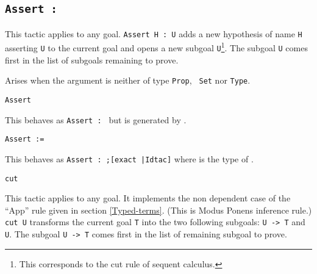 \subsection{\tt Assert {\ident} : {\form}}

This tactic applies to any goal. {\tt Assert H : U} adds a new
hypothesis of name \texttt{H} asserting \texttt{U} to the current goal
and opens a new subgoal \texttt{U}\footnote{This corresponds to the
  cut rule of sequent calculus.}. The subgoal {\texttt U} comes first
in the list of subgoals remaining to prove.

\begin{ErrMsgs}
\item {}
  
  Arises when the argument {\form} is neither of type {\tt Prop}, {\tt
    Set} nor {\tt Type}.

\end{ErrMsgs}

\begin{Variants}
\item{\tt Assert {\form}}
  
  This behaves as {\tt Assert {\ident} : {\form}} but {\ident} is
  generated by {\Coq}.

\item{\tt Assert {\ident} := {\term}}
  
  This behaves as {\tt Assert {\ident} : {\type};[exact
    {\term}|Idtac]} where {\type} is the type of {\term}.

\item {\tt cut {\form}} 
  
  This tactic applies to any goal. It implements the non dependent
  case of the ``App'' rule given in section
  \ref{Typed-terms}. (This is Modus Ponens inference rule.)  {\tt cut
    U} transforms the current goal \texttt{T} into the two following
  subgoals: {\tt U -> T} and \texttt{U}.  The subgoal {\tt U -> T}
  comes first in the list of remaining subgoal to prove.

\end{Variants}

